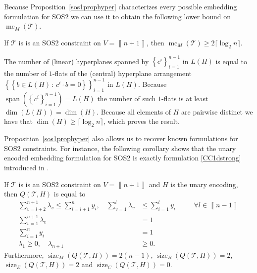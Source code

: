 \documentclass[mnsc]{informs3}
\newcommand{\set}[1]{\left\{#1\right\}}                     %
\newcommand{\bra}[1]{\left(#1\right)}
\newcommand{\sidx}[1]{\left\llbracket     #1 \right\rrbracket}
\DeclareMathOperator{\size}{size}
\DeclareMathOperator{\mmc}{mc}
\DeclareMathOperator{\spann}{span}
\begin{document}
Because Proposition~\ref{sos1prophyper} characterizes every possible embedding formulation for SOS2 we can use it to obtain the following lower bound on $\mmc_M\bra{\mathcal{T}}$.

\begin{corollary}\label{soslb} If $\mathcal{T}$ is is an SOS2 constraint on  $V=\sidx{n+1}$, then $\mmc_M\bra{\mathcal{T}}\geq 2\lceil \log_2 n\rceil$. 
\end{corollary}
The number of (linear) hyperplanes spanned by $\set{c^i}_{i=1}^{n-1}$ in $L(H)$ is equal to the number of $1$-flats of the (central) hyperplane arrangement $\set{\set{b\in L(H)\,:\, c^i\cdot b =0}}_{i=1}^{n-1}$ in $L(H)$. Because $\spann\bra{\set{c^i}_{i=1}^{n-1}}=L(H)$ the number of such $1$-flats is at least $\dim(L(H))=\dim(H)$. Because all elements of $H$ are pairwise distinct  we have that $\dim(H)\geq \lceil \log_2 n\rceil$, which proves the result. 
\Halmos\endproof

Proposition~\ref{sos1prophyper} also allows us to recover known formulations for SOS2 constraints. For instance, the following corollary shows that the unary encoded embedding formulation for SOS2 is exactly formulation \eqref{CC1dstrong} introduced in  \cite{padberg00}.

\begin{corollary}\label{sosunary} If $\mathcal{T}$ is is an SOS2 constraint on  $V=\sidx{n+1}$ and $H$ is the unary encoding, then $Q\bra{\mathcal{T},H}$ is equal to  
\begin{subequations}
\begin{alignat}{3}
\sum\nolimits_{v=l+2}^{n+1} \lambda_v \leq \sum\nolimits_{i=l+1}^n y_i,\quad  
\sum\nolimits_{v=1}^{l} \lambda_v& \leq \sum\nolimits_{i=1}^l y_i &\quad&\forall l \in \sidx{n-1}\\
\sum\nolimits_{v=1}^{n+1} \lambda_v &=1\\
\sum\nolimits_{i=1}^{n} y_i &=1\\
\lambda_1\geq 0, \quad
\lambda_{n+1}&\geq 0. &\quad& 
\end{alignat}
\end{subequations}
Furthermore, $\size_M\bra{Q\bra{\mathcal{T},H}}=2(n-1)$,  $\size_B\bra{Q\bra{\mathcal{T},H}}=2$, $\size_E\bra{Q\bra{\mathcal{T},H}}=2$ and $\size_C\bra{Q\bra{\mathcal{T},H}}=0$.
\end{corollary} 
\end{document}
